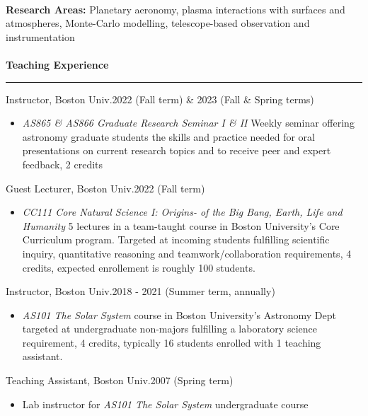 \documentclass[12pt]{report}
\begin{document}
\vspace{1 mm}\\
\textbf{Research Areas:} Planetary aeronomy, plasma interactions with surfaces and atmospheres, Monte-Carlo modelling, telescope-based observation and instrumentation\\
\vspace{2 mm}\\
\bf{Teaching Experience}\rm \hspace*{\fill} \\
\rule{\textwidth}{1pt}
\noindent Instructor, Boston Univ.\hfill 2022 (Fall term) \& 2023 (Fall \& Spring terms)
   \begin{itemize} \itemsep -2pt %
   \item \textit{AS865 \& AS866 Graduate Research Seminar I \& II} Weekly seminar offering astronomy graduate students the skills and practice needed for oral presentations on current research topics and to receive peer and expert feedback, 2 credits
 \end{itemize}
\noindent Guest Lecturer, Boston Univ.\hfill 2022 (Fall term)
   \begin{itemize} \itemsep -2pt %
   \item \textit{CC111 Core Natural Science I: Origins- of the Big Bang, Earth, Life and Humanity} 5 lectures in a team-taught course in Boston University's Core Curriculum program. Targeted at incoming students fulfilling scientific inquiry, quantitative reasoning and teamwork/collaboration requirements, 4 credits, expected enrollement is roughly 100 students.
 \end{itemize}
\noindent Instructor, Boston Univ.\hfill 2018 - 2021 (Summer term, annually)
   \begin{itemize} \itemsep -2pt %
   \item \textit{AS101 The Solar System} course in Boston University's Astronomy Dept targeted at undergraduate
non-majors fulfilling a laboratory science requirement, 4 credits, typically 16 students enrolled with 1 teaching assistant.
 \end{itemize}
\noindent Teaching Assistant, Boston Univ.\hfill 2007 (Spring term)
   \begin{itemize} \itemsep -2pt %
   \item Lab instructor for \textit{AS101 The Solar System} undergraduate course
 \end{itemize}
\end{document}
